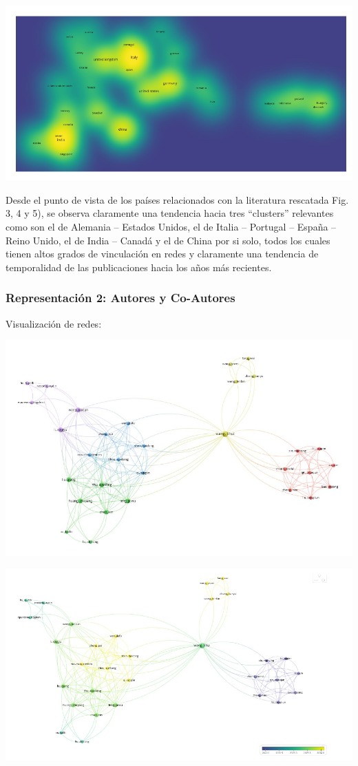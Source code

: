 \documentclass{article}
\begin{document}
\includegraphics{images/clipboard-3556468416.png}

Desde el punto de vista de los países relacionados con la literatura
rescatada Fig. 3, 4 y 5), se observa claramente una tendencia hacia tres
``clusters'' relevantes como son el de Alemania -- Estados Unidos, el de
Italia -- Portugal -- España -- Reino Unido, el de India -- Canadá y el
de China por si solo, todos los cuales tienen altos grados de
vinculación en redes y claramente una tendencia de temporalidad de las
publicaciones hacia los años más recientes.

\subsubsection{Representación 2: Autores y
Co-Autores}\label{representaciuxf3n-2-autores-y-co-autores}

Visualización de redes:

\includegraphics{images/clipboard-148888774.png}

\includegraphics{images/clipboard-1435620609.png}
\end{document}
